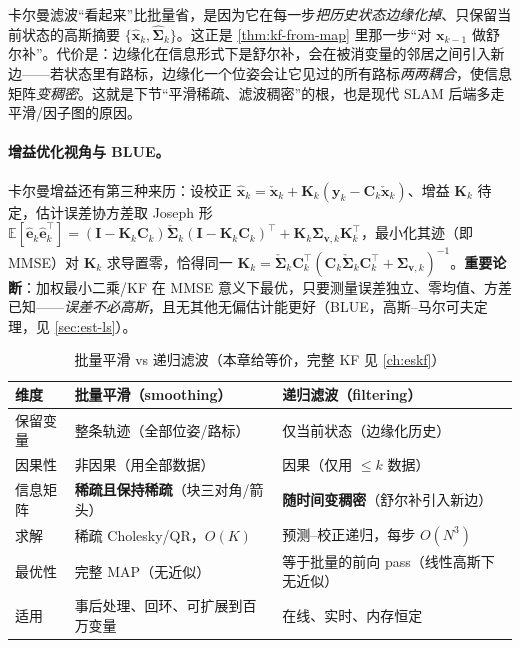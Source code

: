 \begin{insight}[滤波 $=$ 边缘化历史]
卡尔曼滤波“看起来”比批量省，是因为它在每一步\emph{把历史状态边缘化掉}、只保留当前状态的高斯摘要 $\{\hat{\mathbf{x}}_k,\hat{\boldsymbol{\Sigma}}_k\}$。这正是 \cref{thm:kf-from-map} 里那一步“对 $\mathbf{x}_{k-1}$ 做舒尔补”。代价是：边缘化在信息形式下是舒尔补，会在被消变量的邻居之间引入新边——若状态里有路标，边缘化一个位姿会让它见过的所有路标\emph{两两耦合}，使信息矩阵\emph{变稠密}。这就是下节“平滑稀疏、滤波稠密”的根，也是现代 SLAM 后端多走平滑/因子图的原因。
\end{insight}

\paragraph{增益优化视角与 BLUE。}
卡尔曼增益还有第三种来历\cite{barfoot2024state}：设校正 $\hat{\mathbf{x}}_k=\check{\mathbf{x}}_k+\mathbf{K}_k(\mathbf{y}_k-\mathbf{C}_k\check{\mathbf{x}}_k)$、增益 $\mathbf{K}_k$ 待定，估计误差协方差取 Joseph 形 $\mathbb{E}[\hat{\mathbf{e}}_k\hat{\mathbf{e}}_k^\top]=(\mathbf{I}-\mathbf{K}_k\mathbf{C}_k)\check{\boldsymbol{\Sigma}}_k(\mathbf{I}-\mathbf{K}_k\mathbf{C}_k)^\top+\mathbf{K}_k\boldsymbol{\Sigma}_{\mathbf{v},k}\mathbf{K}_k^\top$，最小化其迹（即 MMSE）对 $\mathbf{K}_k$ 求导置零，恰得同一 $\mathbf{K}_k=\check{\boldsymbol{\Sigma}}_k\mathbf{C}_k^\top(\mathbf{C}_k\check{\boldsymbol{\Sigma}}_k\mathbf{C}_k^\top+\boldsymbol{\Sigma}_{\mathbf{v},k})^{-1}$。\textbf{重要论断}：加权最小二乘/KF 在 MMSE 意义下最优，只要测量误差独立、零均值、方差已知——\emph{误差不必高斯}，且无其他无偏估计能更好（BLUE，高斯–马尔可夫定理，见 \cref{sec:est-ls}）。

\begin{table}[ht]\centering\small
\caption{批量平滑 vs 递归滤波（本章给等价，完整 KF 见 \cref{ch:eskf}）}
\label{tab:est-batch-vs-recursive}
\begin{tabular}{lll}
\toprule
维度 & 批量平滑（smoothing） & 递归滤波（filtering） \\
\midrule
保留变量 & 整条轨迹（全部位姿/路标） & 仅当前状态（边缘化历史） \\
因果性 & 非因果（用全部数据） & 因果（仅用 $\le k$ 数据） \\
信息矩阵 & \textbf{稀疏且保持稀疏}（块三对角/箭头） & \textbf{随时间变稠密}（舒尔补引入新边） \\
求解 & 稀疏 Cholesky/QR，$O(K)$ & 预测–校正递归，每步 $O(N^3)$ \\
最优性 & 完整 MAP（无近似） & 等于批量的前向 pass（线性高斯下无近似） \\
适用 & 事后处理、回环、可扩展到百万变量 & 在线、实时、内存恒定 \\
\bottomrule
\end{tabular}
\end{table}


